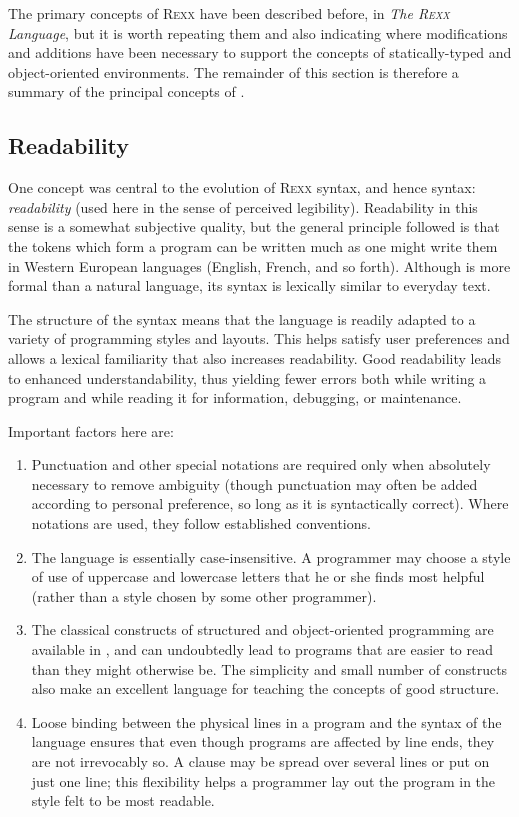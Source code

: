 The primary concepts of R\textsc{exx} have been described before, in \emph{The
  R\textsc{exx} Language}, but it is worth repeating them and also indicating
where modifications and additions have been necessary to support the
concepts of statically-typed and object-oriented environments. The
remainder of this section is therefore a summary of the principal
concepts of \nr{}.
\subsection{Readability}
One concept was central to the evolution of R\textsc{exx} syntax, and hence \nr{} syntax: \emph{readability} (used here in the sense of perceived legibility). Readability in this sense is a somewhat subjective quality, but the general principle followed is that the tokens which form a program can be written much as one might write them in Western European languages (English, French, and so forth). Although \nr{} is more formal than a natural language, its syntax is lexically similar to everyday text.

The structure of the syntax means that the language is readily adapted
to a variety of programming styles and layouts. This helps satisfy
user preferences and allows a lexical familiarity that also increases
readability. Good readability leads to enhanced understandability,
thus yielding fewer errors both while writing a program and while
reading it for information, debugging, or maintenance.

Important factors here are:
\begin{enumerate}
\item Punctuation and other special notations are required only when absolutely necessary to remove ambiguity (though punctuation may often be added according to personal preference, so long as it is syntactically correct). Where notations are used, they follow established conventions.
\item The language is essentially case-insensitive. A \nr{}
  programmer may choose a style of use of uppercase and lowercase letters that he or she finds most helpful (rather than a style chosen by some other programmer).
\item The classical constructs of structured and object-oriented
  programming are available in \nr{}, and can undoubtedly lead to
  programs that are easier to read than they might otherwise be. The
  simplicity and small number of constructs also make \nr{} an
  excellent language for teaching the concepts of good structure.
\item Loose binding between the physical lines in a program and the syntax of the language ensures that even though programs are affected by line ends, they are not irrevocably so. A clause may be spread over several lines or put on just one line; this flexibility helps a programmer lay out the program in the style felt to be most readable.
\end{enumerate}
